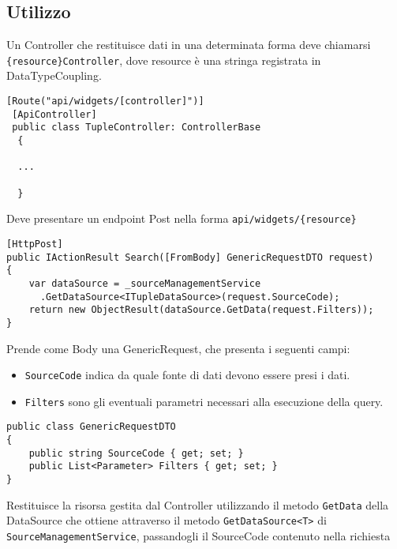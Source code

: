 \subsection{Utilizzo}
Un Controller che restituisce dati in una determinata forma deve chiamarsi \verb|{resource}Controller|, dove resource è una stringa registrata in DataTypeCoupling.
\begin{lstlisting}[caption={TupleController.cs}, style=sharpCode]
 [Route("api/widgets/[controller]")]
 [ApiController]
 public class TupleController: ControllerBase
  {
  
  ...
  
  }
\end{lstlisting}
Deve presentare un endpoint Post nella forma \verb|api/widgets/{resource}|
\begin{lstlisting}[caption={TupleController.cs}, style=sharpCode]
[HttpPost]
public IActionResult Search([FromBody] GenericRequestDTO request)
{
    var dataSource = _sourceManagementService
      .GetDataSource<ITupleDataSource>(request.SourceCode);
    return new ObjectResult(dataSource.GetData(request.Filters));
}
\end{lstlisting}
Prende come Body una GenericRequest, che presenta i seguenti campi:
\begin{itemize}
\item \verb|SourceCode| indica da quale fonte di dati devono essere presi i dati.
\item \verb|Filters| sono gli eventuali parametri necessari alla esecuzione della query.
\end{itemize}
\begin{lstlisting}[caption={GenericRequestDTO.cs}, style=sharpCode]
public class GenericRequestDTO
{
    public string SourceCode { get; set; }
    public List<Parameter> Filters { get; set; }
}
\end{lstlisting}
Restituisce la risorsa gestita dal Controller utilizzando il metodo \verb|GetData| della DataSource che ottiene attraverso il metodo \verb|GetDataSource<T>| di \verb|SourceManagementService|, passandogli il SourceCode contenuto nella richiesta